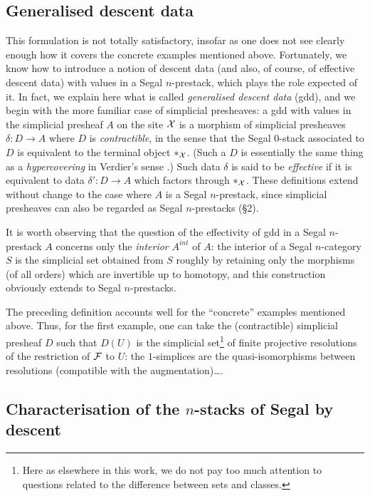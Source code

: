 \subsection*{Generalised descent data}

This formulation is not totally satisfactory, insofar as one does not see
clearly enough how it covers the concrete examples mentioned above.
Fortunately, we know how to introduce a notion of descent data (and also, of
course, of effective descent data) with values in a Segal $n$-prestack, which
plays the role expected of it. In fact, we explain here what is called
\emph{generalised descent data} (gdd), and we begin with the more familiar
case of simplicial presheaves: a gdd with values in the simplicial presheaf
$A$ on the site ${\cal X}$ is a morphism of simplicial presheaves
$\delta: D \rightarrow A$ where $D$ is \emph{contractible}, in the sense that
the Segal $0$-stack associated to $D$ is equivalent to the terminal object
$*_{{\cal X}}$. (Such a $D$ is essentially the same thing as a
\emph{hypercovering} in Verdier's sense \cite{SGA4b}.) Such data $\delta$ is
said to be \emph{effective} if it is equivalent to data
$\delta': D \rightarrow A$ which factors through $*_{{\cal X}}$. These definitions
extend without change to the case where $A$ is a Segal $n$-prestack, since
simplicial presheaves can also be regarded as Segal $n$-prestacks (\S2).

It is worth observing that the question of the effectivity of gdd in a Segal
$n$-prestack $A$ concerns only the \emph{interior} $A^{int}$ of $A$: the
interior of a Segal $n$-category $S$ is the simplicial set obtained from $S$
roughly by retaining only the morphisms (of all orders) which are invertible
up to homotopy, and this construction obviously extends to Segal
$n$-prestacks.

The preceding definition accounts well for the ``concrete'' examples
mentioned above. Thus, for the first example, one can take the (contractible)
simplicial presheaf $D$ such that $D(U)$ is the simplicial set\footnote{Here
as elsewhere in this work, we do not pay too much attention to questions
related to the difference between sets and classes.} of finite projective
resolutions of the restriction of ${\cal F}$ to $U$: the $1$-simplices are the
quasi-isomorphisms between resolutions (compatible with the augmentation)\ldots.

\subsection*{Characterisation of the \texorpdfstring{$n$}{n}-stacks of Segal by descent}

